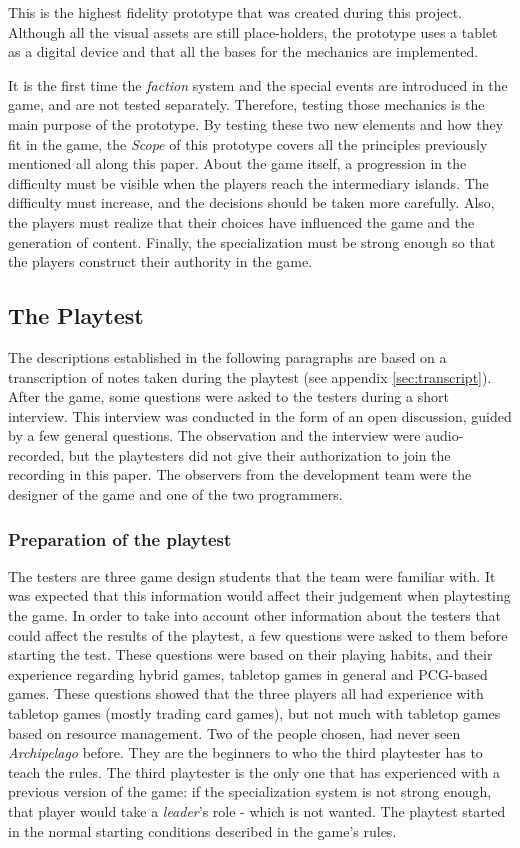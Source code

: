 This is the highest fidelity prototype that was created during this project. Although all the visual assets are still place-holders, the prototype uses a tablet as a digital device and that all the bases for the mechanics are implemented. 

It is the first time the \textit{faction} system and the special events are introduced in the game, and are not tested separately. Therefore, testing those mechanics is the main purpose of the prototype. By testing these two new elements and how they fit in the game, the \textit{Scope} of this prototype covers all the principles previously mentioned all along this paper. About the game itself, a progression in the difficulty must be visible when the players reach the intermediary islands. The difficulty must increase, and the decisions should be taken more carefully. Also, the players must realize that their choices have influenced the game and the generation of content. Finally, the specialization must be strong enough so that the players construct their authority in the game. 

\subsection{The Playtest}
The descriptions established in the following paragraphs are based on a transcription of notes taken during the playtest (see appendix \ref{sec:transcript}). After the game, some questions were asked to the testers during a short interview. This interview was conducted in the form of an open discussion, guided by a few general questions. The observation and the interview were audio-recorded, but the playtesters did not give their authorization to join the recording in this paper. The observers from the development team were the designer of the game and one of the two programmers.

\subsubsection{Preparation of the playtest}

The testers are three game design students that the team were familiar with. It was expected that this information would affect their judgement when playtesting the game. In order to take into account other information about the testers that could affect the results of the playtest, a few questions were asked to them before starting the test. These questions were based on their playing habits, and their experience regarding hybrid games, tabletop games in general and PCG-based games. These questions showed that the three players all had experience with tabletop games (mostly trading card games), but not much with tabletop games based on resource management. Two of the people chosen, had never seen \textit{Archipelago} before. They are the beginners to who the third playtester has to teach the rules. The third playtester is the only one that has experienced with a previous version of the game: if the specialization system is not strong enough, that player would take a \textit{leader}'s role - which is not wanted. The playtest started in the normal starting conditions described in the game's rules.

